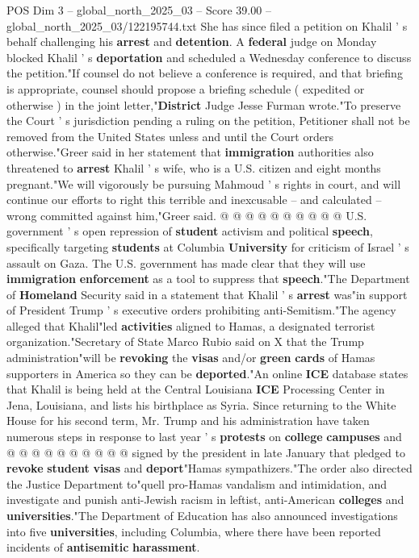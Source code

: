\begin{textsample}{POS Dim 3 – global\_north\_2025\_03 – Score 39.00 – global\_north\_2025\_03/122195744.txt}
She has since filed a petition on Khalil ' s behalf challenging his \textbf{arrest} and \textbf{detention}.
A \textbf{federal} judge on Monday blocked Khalil ' s \textbf{deportation} and scheduled a Wednesday conference to discuss the petition."If counsel do not believe a conference is required, and that briefing is appropriate, counsel should propose a briefing schedule ( expedited or otherwise ) in the joint letter,"\textbf{District} Judge Jesse Furman wrote."To preserve the Court ' s jurisdiction pending a ruling on the petition, Petitioner shall not be removed from the United States unless and until the Court orders otherwise."Greer said in her statement that \textbf{immigration} authorities also threatened to \textbf{arrest} Khalil ' s wife, who is a U.S. citizen and eight months pregnant."We will vigorously be pursuing Mahmoud ' s rights in court, and will continue our efforts to right this terrible and inexcusable -- and calculated -- wrong committed against him,"Greer said. @ @ @ @ @ @ @ @ @ @ U.S. government ' s open repression of \textbf{student} activism and political \textbf{speech}, specifically targeting \textbf{students} at Columbia \textbf{University} for criticism of Israel ' s assault on Gaza.
The U.S. government has made clear that they will use \textbf{immigration} \textbf{enforcement} as a tool to suppress that \textbf{speech}."The Department of \textbf{Homeland} Security said in a statement that Khalil ' s \textbf{arrest} was"in support of President Trump ' s executive orders prohibiting anti-Semitism."The agency alleged that Khalil"led \textbf{activities} aligned to Hamas, a designated terrorist organization."Secretary of State Marco Rubio said on X that the Trump administration"will be \textbf{revoking} the \textbf{visas} and/or \textbf{green} \textbf{cards} of Hamas supporters in America so they can be \textbf{deported}."An online \textbf{ICE} database states that Khalil is being held at the Central Louisiana \textbf{ICE} Processing Center in Jena, Louisiana, and lists his birthplace as Syria.
Since returning to the White House for his second term, Mr.
Trump and his administration have taken numerous steps in response to last year ' s \textbf{protests} on \textbf{college} \textbf{campuses} and @ @ @ @ @ @ @ @ @ @ signed by the president in late January that pledged to \textbf{revoke} \textbf{student} \textbf{visas} and \textbf{deport}"Hamas sympathizers."The order also directed the Justice Department to"quell pro-Hamas vandalism and intimidation, and investigate and punish anti-Jewish racism in leftist, anti-American \textbf{colleges} and \textbf{universities}."The Department of Education has also announced investigations into five \textbf{universities}, including Columbia, where there have been reported incidents of \textbf{antisemitic} \textbf{harassment}.

\end{textsample}
